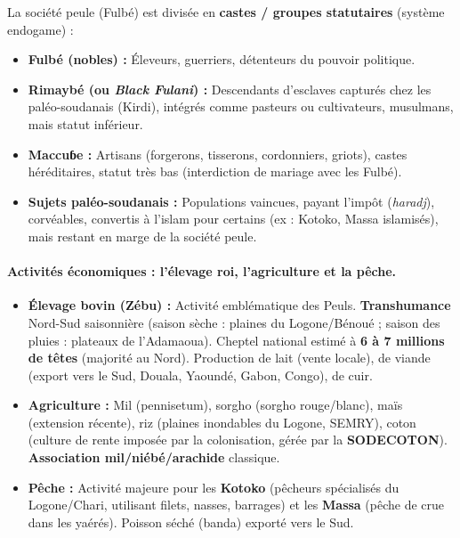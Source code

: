 \documentclass[11pt]{article}
\begin{document}
\noindent
La société peule (Fulbé) est divisée en \textbf{castes / groupes statutaires} (système endogame) :
\begin{itemize}
    \item \textbf{Fulbé (nobles) :} Éleveurs, guerriers, détenteurs du pouvoir politique.
    \item \textbf{Rimaybé (ou \emph{Black Fulani}) :} Descendants d'esclaves capturés chez les paléo-soudanais (Kirdi), intégrés comme pasteurs ou cultivateurs, musulmans, mais statut inférieur.
    \item \textbf{Maccuɓe :} Artisans (forgerons, tisserons, cordonniers, griots), castes héréditaires, statut très bas (interdiction de mariage avec les Fulbé).
    \item \textbf{Sujets paléo-soudanais :} Populations vaincues, payant l'impôt (\emph{haradj}), corvéables, convertis à l'islam pour certains (ex : Kotoko, Massa islamisés), mais restant en marge de la société peule.
\end{itemize}

\paragraph{Activités économiques : l'élevage roi, l'agriculture et la pêche.}
\begin{itemize}
    \item \textbf{Élevage bovin (Zébu) :} Activité emblématique des Peuls. \textbf{Transhumance} Nord-Sud saisonnière (saison sèche : plaines du Logone/Bénoué ; saison des pluies : plateaux de l'Adamaoua). Cheptel national estimé à \textbf{6 à 7 millions de têtes} (majorité au Nord). Production de lait (vente locale), de viande (export vers le Sud, Douala, Yaoundé, Gabon, Congo), de cuir.
    \item \textbf{Agriculture :} Mil (pennisetum), sorgho (sorgho rouge/blanc), maïs (extension récente), riz (plaines inondables du Logone, SEMRY), coton (culture de rente imposée par la colonisation, gérée par la \textbf{SODECOTON}). \textbf{Association mil/niébé/arachide} classique.
    \item \textbf{Pêche :} Activité majeure pour les \textbf{Kotoko} (pêcheurs spécialisés du Logone/Chari, utilisant filets, nasses, barrages) et les \textbf{Massa} (pêche de crue dans les yaérés). Poisson séché (banda) exporté vers le Sud.
\end{itemize}
\end{document}
